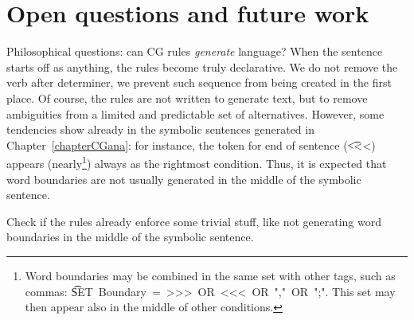 \section{Open questions and future work}

Philosophical questions: can CG rules {\em generate} language?
When the sentence starts off as anything, the rules become truly declarative.
We do not remove the verb after determiner, we prevent such sequence from being created in the first place.
Of course, the rules are not written to generate text, but to remove ambiguities from a limited and predictable set of alternatives.
However, some tendencies show already in the symbolic sentences generated in Chapter~\ref{chapterCGana}: for instance, the token for end of sentence (\t{<<<}) appears 
(nearly\footnote{Word boundaries may be combined in the same set with other tags, such as commas: \t{SET~Boundary~=~>>>~OR~<<<~OR~","~OR~";"}. This set may then appear also in the middle of other conditions.}) 
always as the rightmost condition.
Thus, it is expected that word boundaries are not usually generated in the middle of the symbolic sentence.

Check if the rules already enforce some trivial stuff, like not generating word boundaries in the middle of the symbolic sentence.